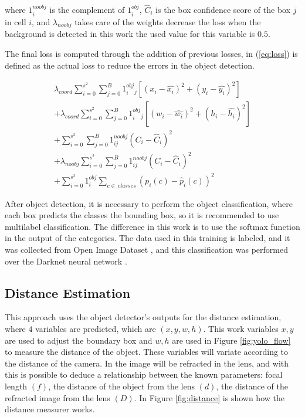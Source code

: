 where $1^{noobj}_i$ is the complement of $1^{obj}_i$, $\hat{C}_i$ is the box confidence score of the box $j$ in cell $i$, and $\lambda_{noobj}$ takes care of the weights decrease the loss when the background is detected in this work the used value for this variable is $0.5$. 

The final loss is computed through the addition of previous losses, in (\ref{eq:loss}) is defined as the actual loss to reduce the errors in the object detection.

\begin{equation}
\label{eq:loss}
\begin{aligned}
    \lambda_{coord}\sum_{i=0}^{s^2}\sum_{j=0}^{B}1^{obj}_i_j\left [ \left ( x_i - \hat{x_i} \right )^2  + (y_i-\hat{y_i})^2 \right ] \\ 
    + \lambda_{coord}\sum_{i=0}^{s^2}\sum_{j=0}^{B}1^{obj}_i_j\left [ \left ( w_i - \hat{w_i} \right )^2  + (h_i-\hat{h_i})^2 \right ] \\
+    \sum_{i=0}^{s^2}\sum_{j=0}^{B}1^{noobj}_{ij}\left ( C_i - \hat{C}_i \right )^2\\
+  \lambda_{noobj}\sum_{i=0}^{s^2}\sum_{j=0}^{B}1^{noobj}_{ij}\left ( C_i - \hat{C}_i \right )^2\\
+     \sum_{i=0}^{s^2}1^{obj}_i \sum_{c\in~classes} \left ( p_i\left ( c \right )-\hat{p}_i\left ( c \right )\right )^2
    \end{aligned}
\end{equation}

After object detection, it is necessary to perform the object classification, where each box predicts the classes the bounding box, so it is recommended to use multilabel classification. The difference in this work is to use the softmax function in the output of the categories. The data used in this training is labeled, and it was collected from Open Image Dataset \cite{krasin2017openimages}, and this classification was performed over the Darknet neural network \cite{redmon2013darknet}.

\subsection{Distance Estimation}

This approach uses the object detector's outputs for the distance estimation, where $4$ variables are predicted, which are $(x, y, w, h)$. This work variables $x,y$ are used to adjust the boundary box and $w, h$ are used in Figure \ref{fig:yolo_flow} to measure the distance of the object. These variables will variate according to the distance of the camera.  In \cite{cao2013circle} the image will be refracted in the lens, and with this is possible to deduce a relationship between the known parameters: focal length $(f)$, the distance of the object from the lens $(d)$, the distance of the refracted image from the lens $(D)$. In Figure \ref{fig:distance} is shown how the distance measurer works. 



